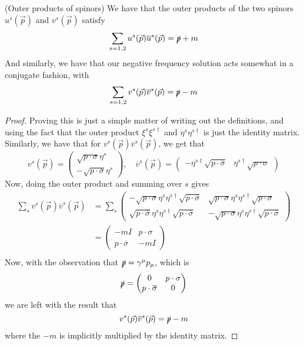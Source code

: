\begin{claim}{(Outer products of spinors)}
	We have that the outer products of the two spinors 
	$ u ^ s ( \vec{p} ) $ and $ v ^s ( \vec{p} ) $ satisfy 
	\[
		\sum_{ s= 1 , 2 } u^ s ( \vec{p} ) \overline{ u } ^ s ( \vec{p} )  =
		\slashed{p} + m 
	\] And similarly, we have that our 
	negative frequency solution acts somewhat in a conjugate fashion, 
	with 
	\[
		\sum_{ s = 1, 2 } v ^ s ( \vec{p} ) \overline{ v } ^ s ( \vec{p} )  = 
		\slashed{p} - m 
	\]
\begin{proof}
	Proving this is just a simple matter 
	of writing out the definitions, and using 
	the fact that the outer product $ \xi ^ s \xi^{ s \dagger }$ and 
	$ \eta ^{ s } \eta ^{ s \dagger } $
	is just the identity matrix. 
	Similarly, we have that for $ v ^ s ( \vec{p} ) \overline{v} ^{ s  } ( \vec{p} )  $, 
	we get that
	\[
		v^ s ( \vec{p} ) = \begin{pmatrix}  \sqrt{ p \cdot  \sigma }  
		\eta ^ s \\  - \sqrt{ p \cdot  \overline{ \sigma } }  \eta ^ s 
	\end{pmatrix} , \quad \overline{ v } ^ s ( \vec{p} ) 
	= \begin{pmatrix}  - \eta ^{ s \dagger } \sqrt{ p \cdot  \overline{ \sigma } } & 
	\eta ^{ s \dagger } \sqrt{ p \cdot  \sigma }  \end{pmatrix} 
	\] Now, doing the outer product and summing over $ s $ gives
	\begin{align*}
		\sum_{ s } v ^ s ( \vec{p} ) 
		\overline{ v } ^ s ( \vec{p} )  &=  \sum_{ s } 
		\begin{pmatrix}   - \sqrt{ p \cdot  \sigma }  \eta ^ s 
		\eta ^{ s \dagger } \sqrt{ p \cdot  \overline{ \sigma } }  & 
	\sqrt{ p \cdot  \sigma }  \eta ^ s \eta ^{ s \dagger  } \sqrt{ p \cdot  \sigma }  \\
	\sqrt{ p \cdot  \overline{ \sigma } }  \eta ^ s \eta ^{ s \dagger } \sqrt{ p \cdot  \overline{ \sigma } }  & - \sqrt{ p \cdot  \sigma }  \eta ^ s \eta ^{ s \dagger } \sqrt{ p \cdot  \overline{ \sigma } }  \end{pmatrix}  \\
														   &=  \begin{pmatrix}  - m I & p \cdot  \sigma \\
														   p \cdot  \overline{ \sigma } &   -mI  \end{pmatrix}  \\
	\end{align*}
	Now, with the observation that $ \slashed{p} = \gamma ^ \mu p _ \mu $, which is 
	\[
		\slashed{p} = \begin{pmatrix}  0 & p \cdot  \sigma \\
		p \cdot  \overline{ \sigma } & 0 \end{pmatrix}  
	\] we are left with the result that 
	\[
		v ^ s ( \vec{p} ) \overline{ v }^ s ( \vec{p} ) = \slashed{p} - m  
	\] where the $ - m $ is implicitly multiplied by the 
	identity matrix. 
\end{proof}
\end{claim}


